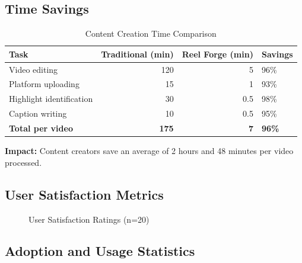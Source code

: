 \subsection{Time Savings}

\begin{table}[H]
\centering
\caption{Content Creation Time Comparison}
\begin{tabular}{@{}lrrl@{}}
\toprule
\textbf{Task} & \textbf{Traditional (min)} & \textbf{Reel Forge (min)} & \textbf{Savings} \\
\midrule
Video editing & 120 & 5 & 96\% \\
Platform uploading & 15 & 1 & 93\% \\
Highlight identification & 30 & 0.5 & 98\% \\
Caption writing & 10 & 0.5 & 95\% \\
\midrule
\textbf{Total per video} & \textbf{175} & \textbf{7} & \textbf{96\%} \\
\bottomrule
\end{tabular}
\end{table}

\textbf{Impact:} Content creators save an average of 2 hours and 48 minutes per video processed.

\subsection{User Satisfaction Metrics}

\begin{figure}[H]
\centering
{}
\caption{User Satisfaction Ratings (n=20)}
\end{figure}

\subsection{Adoption and Usage Statistics}

